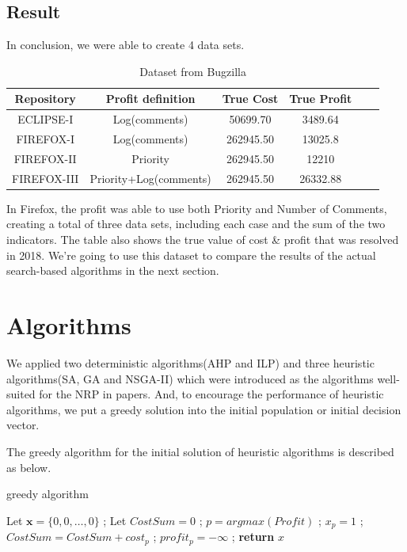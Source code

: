 \subsection{Result}
In conclusion, we were able to create 4 data sets.
\begin{table} [H]
  \caption{Dataset from Bugzilla}
  \label{tab:commands}
  \begin{tabular}{cccccl}
    \toprule
    Repository&Profit definition&True Cost&True Profit\\
    \midrule
    ECLIPSE-I&Log(comments)&50699.70& 3489.64 \\
    FIREFOX-I&Log(comments)& 262945.50& 13025.8 \\
    FIREFOX-II&Priority& 262945.50& 12210 \\
    FIREFOX-III&Priority+Log(comments)& 262945.50& 26332.88 \\
    \bottomrule
  \end{tabular}
\label{table:Dataset}
\end{table}

In Firefox, the profit was able to use both Priority and Number of Comments, creating a total of three data sets, including each case and the sum of the two indicators. The table also shows the true value of cost & profit that was resolved in 2018. We're going to use this dataset to compare the results of the actual search-based algorithms in the next section.



\section{Algorithms}
We applied two deterministic algorithms(AHP and ILP) and three heuristic algorithms(SA, GA and NSGA-II) which were introduced as the algorithms well-suited for the NRP in papers\cite{NRP}\cite{ILP}\cite{IGA}\cite{MONRP}. And, to encourage the performance of heuristic algorithms, we put a greedy solution into the initial population or initial decision vector.

The greedy algorithm for the initial solution of heuristic algorithms is described as below. 

\begin{algorithm}
\caption{greedy algorithm}\label{alg:greedy}
\begin{algorithmic}
    \State Let $\textbf{x} = \{0, 0, \ldots, 0\}$ ;
    \State Let $CostSum = 0$ ;
        \State $p = argmax(Profit)$ ;
            \State $x_p = 1$ ;
            \State $CostSum = CostSum + cost_p$ ;
        \EndIf
        \State $profit_p = -\infty$ ;
    \EndFor
    \textbf{return} $x$
\end{algorithmic}
\end{algorithm}


